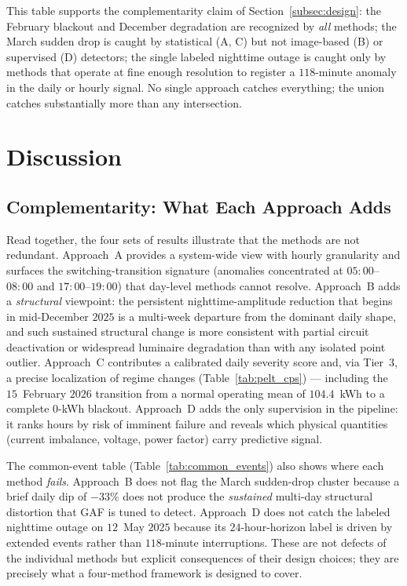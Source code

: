 \documentclass[11pt]{article}
\begin{document}
\begin{enumerate}[leftmargin=1.5em,itemsep=1pt]
This table supports the complementarity claim of Section~\ref{subsec:design}: the February blackout and December degradation are recognized by \emph{all} methods; the March sudden drop is caught by statistical (A, C) but not image-based (B) or supervised (D) detectors; the single labeled nighttime outage is caught only by methods that operate at fine enough resolution to register a $118$-minute anomaly in the daily or hourly signal. No single approach catches everything; the union catches substantially more than any intersection.

\section{Discussion}\label{sec:discussion}

\subsection{Complementarity: What Each Approach Adds}

Read together, the four sets of results illustrate that the methods are not redundant. Approach~A provides a system-wide view with hourly granularity and surfaces the switching-transition signature (anomalies concentrated at $05{:}00$--$08{:}00$ and $17{:}00$--$19{:}00$) that day-level methods cannot resolve. Approach~B adds a \emph{structural} viewpoint: the persistent nighttime-amplitude reduction that begins in mid-December $2025$ is a multi-week departure from the dominant daily shape, and such sustained structural change is more consistent with partial circuit deactivation or widespread luminaire degradation than with any isolated point outlier. Approach~C contributes a calibrated daily severity score and, via Tier~3, a precise localization of regime changes (Table~\ref{tab:pelt_cps}) --- including the $15$~February $2026$ transition from a normal operating mean of $104.4$~kWh to a complete $0$-kWh blackout. Approach~D adds the only supervision in the pipeline: it ranks hours by risk of imminent failure and reveals which physical quantities (current imbalance, voltage, power factor) carry predictive signal.

The common-event table (Table~\ref{tab:common_events}) also shows where each method \emph{fails}. Approach~B does not flag the March sudden-drop cluster because a brief daily dip of $-33\%$ does not produce the \emph{sustained} multi-day structural distortion that GAF is tuned to detect. Approach~D does not catch the labeled nighttime outage on $12$~May $2025$ because its $24$-hour-horizon label is driven by extended events rather than $118$-minute interruptions. These are not defects of the individual methods but explicit consequences of their design choices; they are precisely what a four-method framework is designed to cover.


\end{enumerate}
\end{document}
